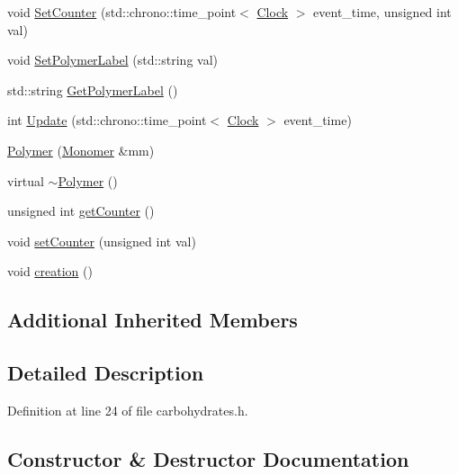 \begin{DoxyCompactItemize}
\item 
void \hyperlink{class_polymer_a1500ffc682396af2f4306c7c7ea7fd87}{Set\+Counter} (std\+::chrono\+::time\+\_\+point$<$ \hyperlink{universe_8h_a0ef8d951d1ca5ab3cfaf7ab4c7a6fd80}{Clock} $>$ event\+\_\+time, unsigned int val)
\item 
void \hyperlink{class_polymer_ab96200f701d9e2e63d22bdfd434e5ccb}{Set\+Polymer\+Label} (std\+::string val)
\item 
std\+::string \hyperlink{class_polymer_a80dbc65ac07e20dce3d9a2e9290c5e3b}{Get\+Polymer\+Label} ()
\item 
int \hyperlink{class_polymer_ac82f603c3010212122008c4ed3953045}{Update} (std\+::chrono\+::time\+\_\+point$<$ \hyperlink{universe_8h_a0ef8d951d1ca5ab3cfaf7ab4c7a6fd80}{Clock} $>$ event\+\_\+time)
\item 
\hyperlink{class_polymer_ae77454a3908652e4df6a26b9cac509a5}{Polymer} (\hyperlink{class_monomer}{Monomer} \&mm)
\item 
virtual \hyperlink{class_polymer_aac2b3983f375a5691c7d5ca1a79594d5}{$\sim$\+Polymer} ()
\item 
unsigned int \hyperlink{class_polymer_a8346d821e5f8690d7816ba1d40036b69}{get\+Counter} ()
\item 
void \hyperlink{class_polymer_a7ed6bbe09a570b59f9253d63fd3326d2}{set\+Counter} (unsigned int val)
\item 
void \hyperlink{class_polymer_a1daba3eb2ba8428bf2f3e814668b155f}{creation} ()
\end{DoxyCompactItemize}
\subsection*{Additional Inherited Members}


\subsection{Detailed Description}


Definition at line 24 of file carbohydrates.\+h.



\subsection{Constructor \& Destructor Documentation}
\mbox{\label{class_polymer_ae77454a3908652e4df6a26b9cac509a5}} 
